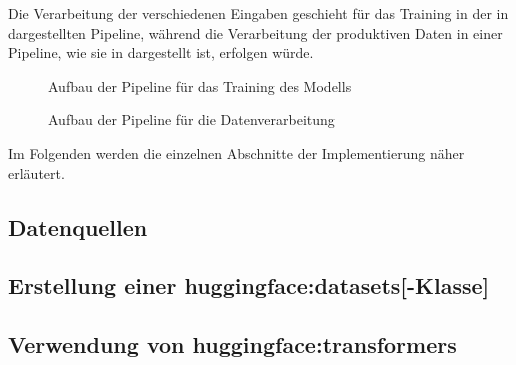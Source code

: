 
Die Verarbeitung der verschiedenen Eingaben
geschieht für das Training in der in 
dargestellten Pipeline,
während die Verarbeitung der produktiven Daten in einer Pipeline,
wie sie in  dargestellt ist,
erfolgen würde.

\begin{figure}
		\begin{adjustbox}{center,max width=\textwidth,max totalheight=0.9\textheight}
		\end{adjustbox}
	\caption{Aufbau der Pipeline für das Training des Modells}
	\label{fig:pipeline:training}
\end{figure}

\begin{figure}
		\begin{adjustbox}{pagecenter,max width=\textwidth,max totalheight=0.9\textheight}
		\end{adjustbox}
	\caption{Aufbau der Pipeline für die Datenverarbeitung}
	\label{fig:pipeline:production}
\end{figure}

Im Folgenden werden die einzelnen Abschnitte der Implementierung näher erläutert.

\subsection{Datenquellen}


\subsection{Erstellung einer \gls{huggingface:datasets}[-Klasse]}


\subsection{Verwendung von \gls{huggingface:transformers}}
